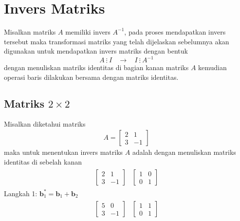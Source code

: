 \section{Invers Matriks}
		\paragraph*{} Misalkan matriks $A$ memiliki invers $A^{-1}$, pada proses mendapatkan invers tersebut maka transformasi matriks yang telah dijelaskan sebelumnya akan digunakan untuk mendapatkan invers matriks dengan bentuk 
		$$A~ \vdots~  I~~~~ \longrightarrow ~~~~I ~\vdots~ A^{-1}$$
		dengan menuliskan matriks identitas di bagian kanan matriks $A$ kemudian operasi baris dilakukan bersama dengan matriks identitas.
		\subsection{Matriks $2\times 2$}
		Misalkan diketahui matriks 
		\begin{align*}
		A = \left[
		\begin{array}{rr} 
			2 & 1 \\
			3 & -1 
		\end{array} 
		\right]
	\end{align*}
maka untuk menentukan invers matriks $A$ adalah dengan menuliskan matriks identitas di sebelah kanan
 	\begin{align*}
 	\begin{array}{r|r} 
 		 \left[
 		\begin{array}{rr} 
 			2 & 1 \\
 			3 & -1 
 		\end{array} 
 		\right]  &  \left[
 		\begin{array}{rr} 
 			1 & 0 \\
 			0 & 1 
 		\end{array} 
 		\right]
 	\end{array}
 \end{align*}
Langkah 1: $\textbf{b}^*_1= \textbf{b}_1 + \textbf{b}_2$ \\
\begin{align*}
	\begin{array}{r|r} 
		\left[
		\begin{array}{rr} 
			5 & 0 \\
			3 & -1 
		\end{array} 
		\right]  &  \left[
		\begin{array}{rr} 
			1 & 1 \\
			0 & 1 
		\end{array} 
		\right]
	\end{array}
\end{align*}
